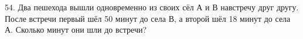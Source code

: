 54. Два пешехода вышли одновременно из своих сёл А и В навстречу друг другу. После встречи первый шёл 50 минут до села В, а второй шёл 18 минут до села А. Сколько минут они шли до встречи?\\

